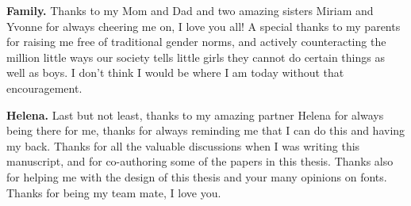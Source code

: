\textbf{Family.} Thanks to my Mom and Dad and two amazing sisters Miriam and Yvonne for always cheering me on, I love you all! A special thanks to my parents for raising me free of traditional gender norms, and actively counteracting the million little ways our society tells little girls they cannot do certain things as well as boys. I don't think I would be where I am today without that encouragement.

\textbf{Helena.} Last but not least, thanks to my amazing partner Helena for always being there for me, thanks for always reminding me that I can do this and having my back. Thanks for all the valuable discussions when I was writing this manuscript, and for co-authoring some of the papers in this thesis. Thanks also for helping me with the design of this thesis and your many opinions on fonts. Thanks for being my team mate, I love you.
